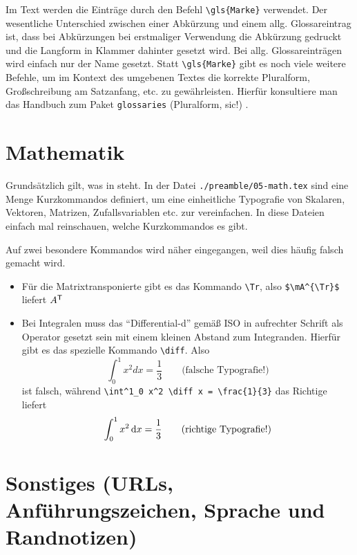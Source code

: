 Im Text werden die Einträge durch den Befehl \verb#\gls{Marke}# verwendet.
Der wesentliche Unterschied zwischen einer Abkürzung und einem allg.
Glossareintrag ist, dass bei Abkürzungen bei erstmaliger Verwendung die
Abkürzung gedruckt und die Langform in Klammer dahinter gesetzt wird.
Bei allg. Glossareinträgen wird einfach nur der Name gesetzt. Statt
\verb#\gls{Marke}# gibt es noch viele weitere Befehle, um im Kontext des
umgebenen Textes die korrekte Pluralform, Großschreibung am Satzanfang, etc.
zu gewährleisten. Hierfür konsultiere man das Handbuch zum Paket \texttt{glossaries}
(Pluralform, sic!) \parencite{talbot2014}.

\section{Mathematik}

Grundsätzlich gilt, was in \parencites{ams1999a}{ams1999b} steht. In der Datei
\texttt{./preamble/05-math.tex} sind eine Menge Kurzkommandos definiert, um eine
einheitliche Typografie von Skalaren, Vektoren,
Matrizen, Zufallsvariablen etc.
zur vereinfachen. In diese Dateien einfach mal reinschauen, welche Kurzkommandos
es gibt.

Auf zwei besondere Kommandos wird näher eingegangen, weil dies häufig falsch
gemacht wird.
\begin{itemize}
  \item Für die Matrixtransponierte gibt es das Kommando \verb#\Tr#, also
	\verb#$\mA^{\Tr}$# liefert $A^{\mathsf{T}}$
	
	\item Bei Integralen muss das \enquote{Differential-d} gemäß
	ISO in aufrechter Schrift als Operator gesetzt sein mit einem kleinen Abstand
	zum Integranden. Hierfür gibt es das spezielle Kommando \verb#\diff#. Also
	\begin{equation}
	 \int^1_0 x^2 d x = \frac{1}{3} \qquad \text{(falsche Typografie!)}
	\end{equation}
	ist falsch, während \verb#\int^1_0 x^2 \diff x = \frac{1}{3}# das Richtige
	liefert
	\begin{equation}
	 \int^1_0 x^2 \mathop{}\!\mathrm{d} x = \frac{1}{3} \qquad \text{(richtige Typografie!)}
	\end{equation}
\end{itemize}

\section{Sonstiges (URLs, Anführungszeichen, Sprache und Randnotizen)}

